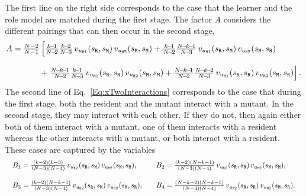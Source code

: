 \documentclass[11pt]{article}
\def\resident{\texttt{R}}
\def\mutant{\texttt{M}}
\def\strategy{s}
\theoremstyle{plainCl1}
\theoremstyle{plainCl2}
\begin{document}

\noindent
The first line on the right side corresponds to the case that the learner and
the role model are matched during the first stage. 
The factor $A$ considers the different pairings that can then occur in the second stage, 
\begin{equation*}
  \setlength{\arraycolsep}{1pt}
  \begin{array}{ll}
  A  = \frac{N-2}{N-1} & \left[ \frac{k\!-\!1}{N\!-\!2}\frac{k\!-\!2}{N\!-\!3} \, v_{u_{\mutant 1}}(\strategy_\resident,\strategy_\mutant)\, v_{u_{\mutant 2}}(\strategy_\mutant,\strategy_\mutant) + 
   \frac{k\!-\!1}{N\!-\!2}\frac{N\!-\!k\!-\!1}{N\!-\!3} \, v_{u_{\mutant 1}}(\strategy_\resident,\strategy_\mutant) \, v_{u_{\mutant 2}}(\strategy_\mutant,\strategy_\resident)  \right. \\[0.5cm]
   &+ \left. \frac{N\!-\!k\!-\!1}{N\!-\!2}\frac{k\!-\!1}{N\!-\!3} \, v_{u_{\mutant 1}}(\strategy_\resident,\strategy_\resident) \, v_{u_{\mutant 2}}(\strategy_\mutant,\strategy_\mutant) + 
   \frac{N\!-\!k\!-\!1}{N\!-\!2}\frac{N\!-\!k\!-\!2}{N\!-\!3} \, v_{u_{\mutant 1}}(\strategy_\resident,\strategy_\resident) \, v_{u_{\mutant 2}}(\strategy_\mutant,\strategy_\resident)\right] .
   \end{array} 
\end{equation*}   
 The second line of Eq.~\eqref{Eq:xTwoInteractions} corresponds to the case that during the first stage, both the resident and the mutant interact with a mutant. 
 In the second stage, they may interact with each other. 
 If they do not, then again either both of them interact with a mutant, one of them interacts with a resident whereas the other interacts with a mutant, or both interact with a resident. These cases are captured by the variables 
\begin{equation*}
  \setlength{\arraycolsep}{10pt}
  \begin{array}{ll}
   B_1  = \frac{(k - 2) (k - 3)}{(N - 3) (N - 4)}\, v_{u_{\resident 2}}(\strategy_\resident,\strategy_\mutant) \,v_{u_{\mutant 2}}(\strategy_\mutant,\strategy_\mutant),
   &B_2 = \frac{\left(k - 2\right) \left(N - k - 1\right)}{(N - 3) (N - 4)}\, v_{u_{\resident 2}}(\strategy_\resident,\strategy_\resident) \,v_{u_{\mutant 2}}(\strategy_\mutant,\strategy_\mutant), \\[0.5cm] 
   B_3  = \frac{\left(k - 2\right) \left(N - k - 1\right)}{(N - 3) (N - 4)}\, v_{u_{\resident 2}}(\strategy_\resident,\strategy_\mutant) \,v_{u_{\mutant 2}}(\strategy_\mutant,\strategy_\resident),
   &B_4 = \frac{\left(N - k - 2\right) \left(N - k - 1\right)}{(N - 3) (N - 4)}\, v_{u_{\resident 2}}(\strategy_\resident,\strategy_\resident) \, v_{u_{\mutant 2}}(\strategy_\mutant,\strategy_\resident).
   \end{array}
\end{equation*}
\end{document}
